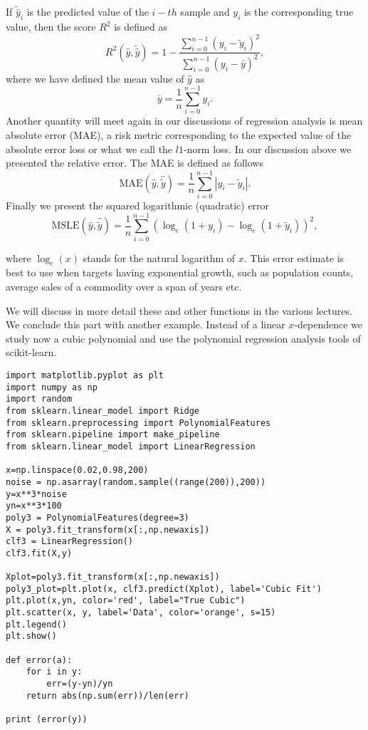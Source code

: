 \documentclass[%
oneside,                 %
final,                   %
10pt]{article}
\begin{document}
If $\tilde{\hat{y}}_i$ is the predicted value of the $i-th$ sample and $y_i$ is the corresponding true value, then the score $R^2$ is defined as
\[
R^2(\hat{y}, \tilde{\hat{y}}) = 1 - \frac{\sum_{i=0}^{n - 1} (y_i - \tilde{y}_i)^2}{\sum_{i=0}^{n - 1} (y_i - \bar{y})^2},
\]
where we have defined the mean value  of $\hat{y}$ as
\[
\bar{y} =  \frac{1}{n} \sum_{i=0}^{n - 1} y_i.
\]
Another quantity will meet again in our discussions of regression analysis is 
 mean absolute error (MAE), a risk metric corresponding to the expected value of the absolute error loss or what we call the $l1$-norm loss. In our discussion above we presented the relative error.
The MAE is defined as follows
\[
\text{MAE}(\hat{y}, \hat{\tilde{y}}) = \frac{1}{n} \sum_{i=0}^{n-1} \left| y_i - \tilde{y}_i \right|.
\]
Finally we present the 
squared logarithmic (quadratic) error
\[
\text{MSLE}(\hat{y}, \hat{\tilde{y}}) = \frac{1}{n} \sum_{i=0}^{n - 1} (\log_e (1 + y_i) - \log_e (1 + \tilde{y}_i) )^2,
\]

where $\log_e (x)$ stands for the natural logarithm of $x$. This error
estimate is best to use when targets having exponential growth, such
as population counts, average sales of a commodity over a span of
years etc. 

We will discuss in more
detail these and other functions in the various lectures.  We conclude this part with another example. Instead of 
a linear $x$-dependence we study now a cubic polynomial and use the polynomial regression analysis tools of scikit-learn. 

\begin{verbatim}
import matplotlib.pyplot as plt
import numpy as np
import random
from sklearn.linear_model import Ridge
from sklearn.preprocessing import PolynomialFeatures
from sklearn.pipeline import make_pipeline
from sklearn.linear_model import LinearRegression

x=np.linspace(0.02,0.98,200)
noise = np.asarray(random.sample((range(200)),200))
y=x**3*noise
yn=x**3*100
poly3 = PolynomialFeatures(degree=3)
X = poly3.fit_transform(x[:,np.newaxis])
clf3 = LinearRegression()
clf3.fit(X,y)

Xplot=poly3.fit_transform(x[:,np.newaxis])
poly3_plot=plt.plot(x, clf3.predict(Xplot), label='Cubic Fit')
plt.plot(x,yn, color='red', label="True Cubic")
plt.scatter(x, y, label='Data', color='orange', s=15)
plt.legend()
plt.show()

def error(a):
    for i in y:
        err=(y-yn)/yn
    return abs(np.sum(err))/len(err)

print (error(y))
\end{verbatim}
\end{document}
